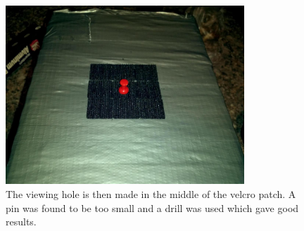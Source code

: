 \documentclass[13pt]{article}
\begin{document}
\begin{figure}[ht!]
\centering
\includegraphics[width=0.8\textwidth]{eps/pinhole.eps}
\caption{The viewing hole is then made in the middle of the velcro patch. A pin was found to be too small and a drill was used which gave good results.}
\end{figure}
\end{document}
